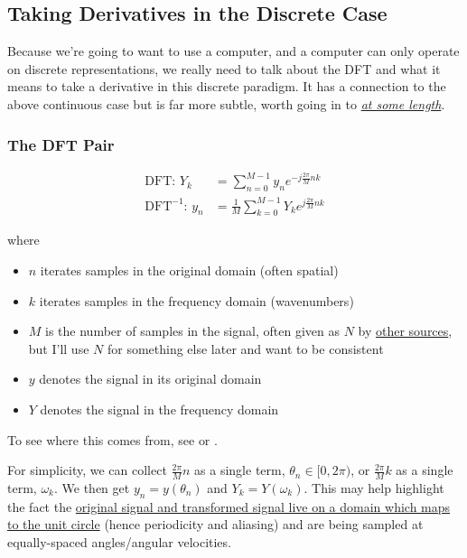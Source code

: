 \documentclass[10pt]{article}
\begin{document}
\subsection{Taking Derivatives in the Discrete Case}

Because we're going to want to use a computer, and a computer can only operate on discrete representations, we really need to talk about the DFT and what it means to take a derivative in this discrete paradigm. It has a connection to the above continuous case but is far more subtle, worth going in to \textit{\href{https://www.youtube.com/watch?v=v7l3Q11DBq0&t=1299s}{at some length}}.

\subsubsection{The DFT Pair}

\begin{equation}\label{dft}
\begin{aligned}
\text{DFT: \ \ } Y_k &= \sum_{n=0}^{M-1} y_n e^{-j \frac{2\pi}{M} n k} \\
\text{DFT} ^{-1} \text{: \ \ } y_n &= \frac{1}{M} \sum_{k=0}^{M-1} Y_k e^{j \frac{2\pi}{M} n k}
\end{aligned}
\end{equation}

where
\begin{itemize}[noitemsep, topsep=0pt, after=\newline]
	\item $n$ iterates samples in the original domain (often spatial)
	\item $k$ iterates samples in the frequency domain (wavenumbers)
	\item $M$ is the number of samples in the signal, often given as $N$ by \href{https://numpy.org/doc/2.1/reference/routines.fft.html}{other sources}\cite{numpy}, but I'll use $N$ for something else later and want to be consistent
	\item $y$ denotes the signal in its original domain
	\item $Y$ denotes the signal in the frequency domain
\end{itemize}

To see where this comes from, see \cite{bretherton} or \cite{oppenheim}.\newline

For simplicity, we can collect $\frac{2\pi}{M}n$ as a single term, $\theta_n \in [0, 2\pi)$, or $\frac{2\pi}{M}k$ as a single term, $\omega_k$. We then get $y_n = y(\theta_n)$ and $Y_k = Y(\omega_k)$. This may help highlight the fact the \href{https://dsp.stackexchange.com/a/18931/40873}{original signal and transformed signal live on a domain which maps to the unit circle}\cite{bristow} (hence periodicity and aliasing) and are being sampled at equally-spaced angles/angular velocities.
\end{document}
